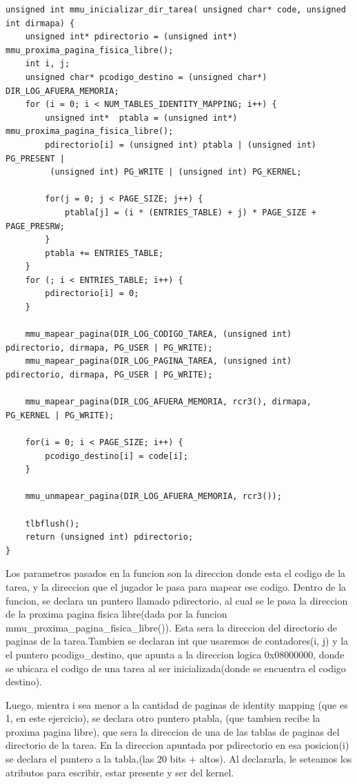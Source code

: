\documentclass[a4paper]{article}
\newenvironment{codesnippet}{%
	\begin{Sbox}\begin{minipage}{\textwidth}\sffamily\small}%
	{\end{minipage}\end{Sbox}%
		\begin{center}%
		\vspace{-0.4cm}\colorbox{litegrey}{\TheSbox}\end{center}\vspace{0.3cm}}
\begin{document}
\begin{codesnippet}
\begin{verbatim}	
unsigned int mmu_inicializar_dir_tarea( unsigned char* code, unsigned int dirmapa) {
	unsigned int* pdirectorio = (unsigned int*) mmu_proxima_pagina_fisica_libre();
	int i, j;
	unsigned char* pcodigo_destino = (unsigned char*) DIR_LOG_AFUERA_MEMORIA;
	for (i = 0; i < NUM_TABLES_IDENTITY_MAPPING; i++) {
		unsigned int*  ptabla = (unsigned int*) mmu_proxima_pagina_fisica_libre();
		pdirectorio[i] = (unsigned int) ptabla | (unsigned int) PG_PRESENT |
		 (unsigned int) PG_WRITE | (unsigned int) PG_KERNEL;

		for(j = 0; j < PAGE_SIZE; j++) {
			ptabla[j] = (i * (ENTRIES_TABLE) + j) * PAGE_SIZE + PAGE_PRESRW;
		}
		ptabla += ENTRIES_TABLE; 
	}
	for (; i < ENTRIES_TABLE; i++) {
		pdirectorio[i] = 0;
	}

	mmu_mapear_pagina(DIR_LOG_CODIGO_TAREA, (unsigned int) pdirectorio, dirmapa, PG_USER | PG_WRITE);
	mmu_mapear_pagina(DIR_LOG_PAGINA_TAREA, (unsigned int) pdirectorio, dirmapa, PG_USER | PG_WRITE);
	
	mmu_mapear_pagina(DIR_LOG_AFUERA_MEMORIA, rcr3(), dirmapa, PG_KERNEL | PG_WRITE);

	for(i = 0; i < PAGE_SIZE; i++) {
		pcodigo_destino[i] = code[i];
	}

	mmu_unmapear_pagina(DIR_LOG_AFUERA_MEMORIA, rcr3());

	tlbflush();
	return (unsigned int) pdirectorio;
}
\end{verbatim}
\end{codesnippet}


Los parametros pasados en la funcion son la direccion donde esta el codigo de la tarea, y la direccion que el jugador le pasa para mapear ese codigo.
Dentro de la funcion, se declara un puntero llamado pdirectorio, al cual se le pasa la direccion de la proxima pagina fisica libre(dada por la funcion mmu_proxima_pagina_fisica_libre()).
 Esta sera la direccion del directorio de paginas de la tarea.Tambien se declaran int que usaremos de contadores(i, j) y la el puntero pcodigo_destino, que apunta a la direccion logica 0x08000000, donde se ubicara el codigo de una tarea al ser inicializada(donde se encuentra el codigo destino).
 
Luego, mientra i sea menor a la cantidad de paginas de identity mapping (que es 1, en este ejercicio), se declara  otro puntero ptabla, (que tambien recibe la proxima pagina libre), que sera la direccion de una de las tablas de paginas del directorio de la tarea. En la direccion apuntada por pdirectorio en esa posicion(i) se declara el puntero a la tabla,(las 20 bits + altos). 
Al declararla, le seteamos   los atributos para escribir, estar presente y ser del kernel.
\end{document}
